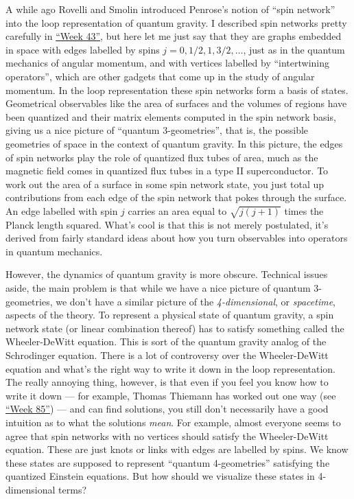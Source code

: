 \documentclass{article}
\begin{document}
A while ago Rovelli and Smolin introduced Penrose's notion of ``spin
network'' into the loop representation of quantum gravity. I described
spin networks pretty carefully in \protect\hyperlink{week43}{``Week
43''}, but here let me just say that they are graphs embedded in space
with edges labelled by spins \(j = 0, 1/2, 1, 3/2,\ldots\), just as in
the quantum mechanics of angular momentum, and with vertices labelled by
``intertwining operators'', which are other gadgets that come up in the
study of angular momentum. In the loop representation these spin
networks form a basis of states. Geometrical observables like the area
of surfaces and the volumes of regions have been quantized and their
matrix elements computed in the spin network basis, giving us a nice
picture of ``quantum 3-geometries'', that is, the possible geometries of
space in the context of quantum gravity. In this picture, the edges of
spin networks play the role of quantized flux tubes of area, much as the
magnetic field comes in quantized flux tubes in a type II
superconductor. To work out the area of a surface in some spin network
state, you just total up contributions from each edge of the spin
network that pokes through the surface. An edge labelled with spin \(j\)
carries an area equal to \(\sqrt{j(j+1)}\) times the Planck length
squared. What's cool is that this is not merely postulated, it's derived
from fairly standard ideas about how you turn observables into operators
in quantum mechanics.

However, the dynamics of quantum gravity is more obscure. Technical
issues aside, the main problem is that while we have a nice picture of
quantum 3-geometries, we don't have a similar picture of the
\emph{4-dimensional}, or \emph{spacetime}, aspects of the theory. To
represent a physical state of quantum gravity, a spin network state (or
linear combination thereof) has to satisfy something called the
Wheeler-DeWitt equation. This is sort of the quantum gravity analog of
the Schrodinger equation. There is a lot of controversy over the
Wheeler-DeWitt equation and what's the right way to write it down in the
loop representation. The really annoying thing, however, is that even if
you feel you know how to write it down --- for example, Thomas Thiemann
has worked out one way (see \protect\hyperlink{week85}{``Week 85''}) ---
and can find solutions, you still don't necessarily have a good
intuition as to what the solutions \emph{mean}. For example, almost
everyone seems to agree that spin networks with no vertices should
satisfy the Wheeler-DeWitt equation. These are just knots or links with
edges are labelled by spins. We know these states are supposed to
represent ``quantum 4-geometries'' satisfying the quantized Einstein
equations. But how should we visualize these states in 4-dimensional
terms?
\end{document}
